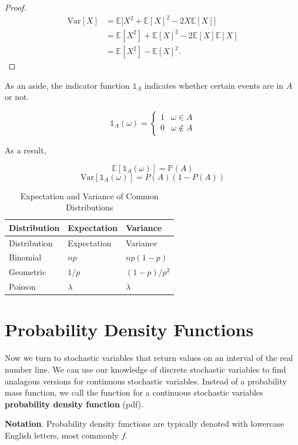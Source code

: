 \documentclass[13pt,oneside]{tufte-book}
\theoremstyle{definition}
\theoremstyle{definition}
\theoremstyle{definition}
\theoremstyle{remark}
\let\BeginKnitrBlock\begin \let\EndKnitrBlock\end
\begin{document}
\BeginKnitrBlock{proof}
{}

\begin{align*}
\mathrm{Var}[X] &= \mathbb{E}\Big[X^2 + \mathbb{E}[X]^2 - 2X\mathbb{E}[X]\Big] \\
&= \mathbb{E}[X^2] + \mathbb{E}[X]^2 - 2\mathbb{E}[X]\mathbb{E}[X] \\
&= \mathbb{E}[X^2] - \mathbb{E}[X]^2.
\end{align*}
\EndKnitrBlock{proof}

\begin{marginfigure}
As an aside, the indicator function \(\mathbb{1}_A\) indicates whether
certain events are in \(A\) or not.

\[
\mathbb{1}_A(\omega) = \begin{cases} 1 & \omega \in A \\ 0 & \omega \not\in A \end{cases}
\]

As a result,

\[\mathbb{E}[\mathbb{1}_A(\omega)] = \mathbb{P}(A)\]
\[\mathrm{Var}[\mathbb{1}_A(\omega)] = P(A)(1-P(A))\]
\end{marginfigure}

\begin{longtable}[]{@{}lll@{}}
\caption{Expectation and Variance of Common
Distributions}\tabularnewline
\toprule
Distribution & Expectation & Variance\tabularnewline
\midrule
\endfirsthead
\toprule
Distribution & Expectation & Variance\tabularnewline
\midrule
\endhead
Binomial & \(np\) & \(np(1-p)\)\tabularnewline
Geometric & \(1/p\) & \((1-p)/p^2\)\tabularnewline
Poisson & \(\lambda\) & \(\lambda\)\tabularnewline
\bottomrule
\end{longtable}

\section{Probability Density
Functions}\label{probability-density-functions}

Now we turn to stochastic variables that return values on an interval of
the real number line. We can use our knowledge of discrete stochastic
variables to find analagous versions for continuous stochastic
variables. Instead of a probability mass function, we call the function
for a continuous stochastic variables \textbf{probability density
function} (pdf).

\begin{marginfigure}
\textbf{Notation}. Probability density functions are typically denoted
with lowercase English letters, most commonly \(f\).
\end{marginfigure}
\end{document}
